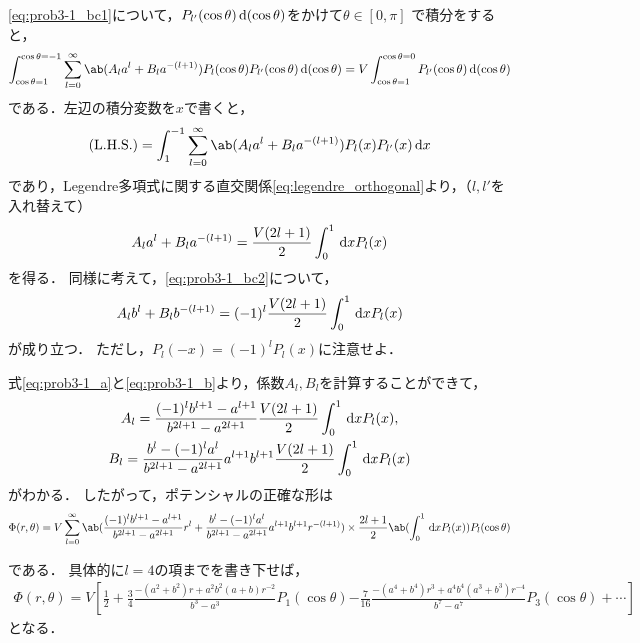 \eqref{eq:prob3-1_bc1}について，$P_{l'}(\cos\theta)\dl{(\cos\theta)}$をかけて$\theta\in[0,\pi]$
で積分をすると，
\begin{gather}%
  \int_{\cos\theta=1}^{\cos\theta=-1} \sum_{l=0}^\infty\ab(A_la^l + B_la^{-(l+1)})
  P_l(\cos\theta) P_{l'}(\cos\theta) \dl{(\cos\theta)} 
  =  V \int_{\cos\theta=1}^{\cos\theta=0} P_{l'}(\cos\theta) \dl{(\cos\theta)}
\end{gather}
である．左辺の積分変数を$x$で書くと，
\begin{gather}%
  \text{(L.H.S.)} = \int_{1}^{-1} \sum_{l=0}^\infty\ab(A_l a^l + B_l a^{-(l+1)})
  P_l(x) P_{l'}(x) \dl{x}
\end{gather}
であり，Legendre多項式に関する直交関係\eqref{eq:legendre_orthogonal}より，（$l,l'$を入れ替えて）
\begin{gather}%
  \label{eq:prob3-1_a}
  A_l a^l + B_l a^{-(l+1)} = \frac{V(2l+1)}{2} \int_0^1 \dl{x} P_l(x)
\end{gather}%
を得る．
同様に考えて，\eqref{eq:prob3-1_bc2}について，
\begin{gather}%
  \label{eq:prob3-1_b}
  A_l b^l + B_l b^{-(l+1)} =(-1)^l \frac{V(2l+1)}{2} \int_0^{1} \dl{x} P_l(x)
\end{gather}%
が成り立つ．
ただし，$P_l(-x) = (-1)^l P_l(x)$に注意せよ．

式\eqref{eq:prob3-1_a}と\eqref{eq:prob3-1_b}より，係数$A_l, B_l$を計算することができて，
\begin{gather}%
  A_l = \frac{(-1)^lb^{l+1}-a^{l+1}}{b^{2l+1}-a^{2l+1}}
  \frac{V(2l+1)}{2} \int_0^1 \dl{x} P_l(x),\\
  B_l = \frac{b^l-(-1)^la^l}{b^{2l+1}-a^{2l+1}}a^{l+1}b^{l+1}
  \frac{V(2l+1)}{2}\int_0^1 \dl{x} P_l(x)
\end{gather}%
がわかる．
したがって，ポテンシャルの正確な形は
\begin{gather}
  \Phi(r,\theta) =
  V \sum_{l=0}^\infty \ab(
  \frac{(-1)^lb^{l+1}-a^{l+1}}{b^{2l+1}-a^{2l+1}} r^l +
  \frac{b^l-(-1)^la^l}{b^{2l+1}-a^{2l+1}}a^{l+1}b^{l+1} r^{-(l+1)}
  )
  \times\frac{2l+1}{2}\ab(\int_0^1 \dl{x} P_l(x))
  P_l(\cos\theta)
\end{gather}

である．
具体的に$l = 4$の項までを書き下せば，
\begin{gather}
  \Phi(r,\theta) = V \left[
    \frac{1}{2} + \frac{3}{4}\frac{-(a^2+b^2)r+a^2b^2(a+b)r^{-2}}{b^3-a^3} P_1(\cos\theta)\right.
    \left.
    -\frac{7}{16}\frac{-(a^4+b^4)r^3 + a^4b^4(a^3+b^3)r^{-4}}{b^7-a^7}P_3(\cos\theta) +\cdots
    \right]
\end{gather}
となる．

